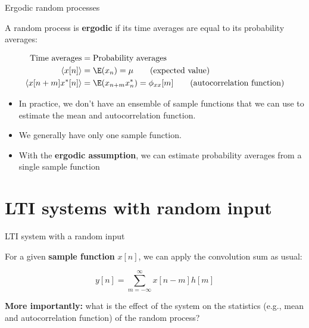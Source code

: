 \documentclass[10pt, aspectratio=169]{beamer}
\begin{document}
\begin{frame}{Ergodic random processes}

A random process is \textbf{ergodic} if its time averages are equal to its probability averages:

\begin{align*}
\text{Time averages} &= \text{Probability averages} \\
\langle x[n] \rangle &= \E(x_n) = \mu \tag{expected value} \\
\langle x[n+m]x^*[n] \rangle &= \E(x_{n+m}x_n^*) = \phi_{xx}[m] \tag{autocorrelation function}
\end{align*}

\begin{itemize}
	\pause\item In practice, we don't have an ensemble of sample functions that we can use to estimate the mean and autocorrelation function.
	\pause\item We generally have only one sample function.
	\pause\item With the \textbf{ergodic assumption}, we can estimate probability averages from a single sample function
\end{itemize}

\end{frame}

%
\section{LTI systems with random input}
\begin{frame}{LTI system with a random input}
\begin{center}
\resizebox{\linewidth}{!}{}
\end{center}

\pause
For a given \textbf{sample function} $x[n]$, we can apply the convolution sum as usual:

\begin{equation*}
y[n] = \sum_{m=-\infty}^{\infty} x[n-m]h[m] 
\end{equation*}

\pause\textbf{More importantly:} what is the effect of the system on the statistics (e.g., mean and autocorrelation function) of the random process?

\end{frame}
\end{document}
